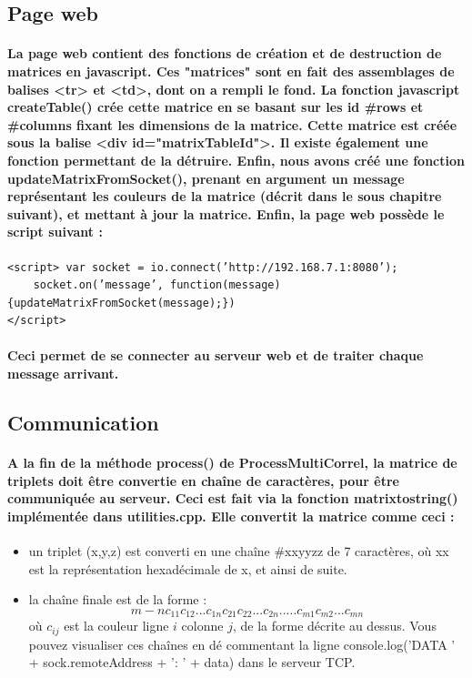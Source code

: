 \documentclass[a4paper]{article}
\begin{document}
\subsection{Page web} \paragraph{La page web contient des fonctions de création
et de destruction de matrices en javascript. Ces "matrices" sont en fait des
assemblages de balises <tr> et <td>, dont on a rempli le fond. La fonction
javascript createTable() crée cette matrice en se basant sur les id \#rows et
\#columns fixant les dimensions de la matrice. Cette matrice est créée sous la
balise <div id="matrixTableId">. Il existe également une fonction permettant de
la détruire. Enfin, nous avons créé une fonction updateMatrixFromSocket(),
prenant en argument un message représentant les couleurs de la matrice (décrit
dans le sous chapitre suivant), et mettant à jour la matrice. Enfin, la page web
possède le script suivant :}

\begin{Verbatim}
<script> var socket = io.connect(’http://192.168.7.1:8080’);
	socket.on(’message’, function(message) {updateMatrixFromSocket(message);})
</script>
\end{Verbatim}

\paragraph{Ceci permet de se connecter au serveur web et de traiter chaque
message arrivant.}

\subsection{Communication} \paragraph{A la fin de la méthode process() de
ProcessMultiCorrel, la matrice de triplets doit être convertie en chaîne de
caractères, pour être communiquée au serveur. Ceci est fait via la fonction
matrixtostring() implémentée dans utilities.cpp. Elle convertit la matrice comme
ceci :}

\begin{itemize} \item un triplet (x,y,z) est converti en une chaîne \#xxyyzz de
7 caractères, où xx est la représentation hexadécimale de x, et ainsi de suite.
\item la chaîne finale est de la forme : \begin{equation} m -
nc_{11}c_{12}...c_{1n}c_{21}c_{22}...c_{2n}.....c_{m1}c_{m2}...c_{mn}
\end{equation} où $c_{ij}$ est la couleur ligne $i$ colonne $j$, de la forme
décrite au dessus. Vous pouvez visualiser ces chaînes en dé commentant la ligne
console.log(’DATA ’ + sock.remoteAddress + ’: ’ + data) dans le serveur TCP.
\end{itemize}
\end{document}
